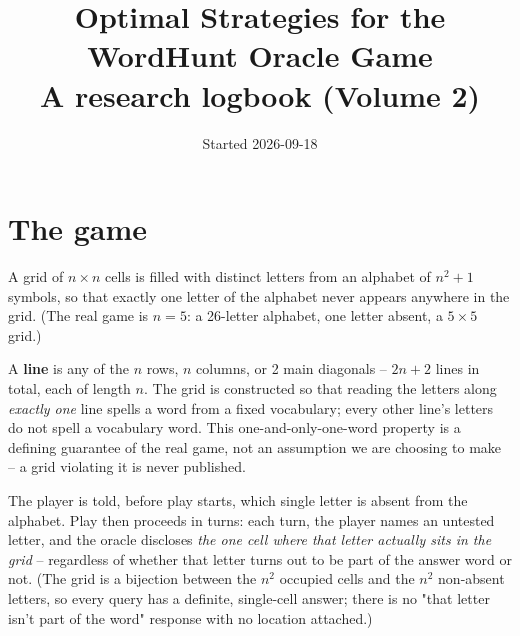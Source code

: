 \documentclass[11pt]{article}
\title{Optimal Strategies for the WordHunt Oracle Game\\
\large A research logbook (Volume 2)}
\author{}
\date{Started 2026-09-18}
\begin{document}
\maketitle

\begin{center}
\end{center}

\section{The game}
\label{sec:game}

A grid of $n \times n$ cells is filled with distinct letters from an
alphabet of $n^2+1$ symbols, so that exactly one letter of the alphabet
never appears anywhere in the grid. (The real game is $n=5$: a 26-letter
alphabet, one letter absent, a $5\times5$ grid.)

A \textbf{line} is any of the $n$ rows, $n$ columns, or 2 main diagonals
-- $2n+2$ lines in total, each of length $n$. The grid is constructed so
that reading the letters along \emph{exactly one} line spells a word from
a fixed vocabulary; every other line's letters do not spell a vocabulary
word. This one-and-only-one-word property is a defining guarantee of the
real game, not an assumption we are choosing to make -- a grid violating
it is never published.

The player is told, before play starts, which single letter is absent
from the alphabet. Play then proceeds in turns: each turn, the player
names an untested letter, and the oracle discloses \emph{the one cell
where that letter actually sits in the grid} -- regardless of whether
that letter turns out to be part of the answer word or not. (The grid is
a bijection between the $n^2$ occupied cells and the $n^2$ non-absent
letters, so every query has a definite, single-cell answer; there is no
"that letter isn't part of the word" response with no location attached.)
\end{document}
